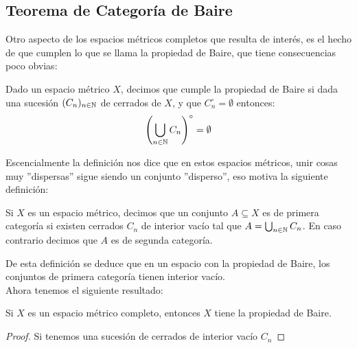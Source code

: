 \documentclass[12pt,a4paper]{book}
\begin{document}
\subsection{Teorema de Categoría de Baire}
Otro aspecto de los espacios métricos completos que resulta de interés, es el hecho de que cumplen lo que se llama la propiedad de Baire, que tiene consecuencias poco obvias:
\begin{defi}
Dado un espacio métrico $X$, decimos que cumple la propiedad de Baire si dada una sucesión $(C_n)_{{n} \in \mathbb{N}}$ de cerrados de $X$, y que $C_n^\circ = \emptyset$ entonces:
$$ \left(\bigcup_{{n} \in \mathbb{N}} C_n \right)^\circ = \emptyset$$
\end{defi}
Escencialmente la definición nos dice que en estos espacios métricos, unir cosas muy ''dispersas'' sigue siendo un conjunto ''disperso'', eso motiva la siguiente definición:
\begin{defi}
Si $X$ es un espacio métrico, decimos que un conjunto $A  \subseteq X$ es de primera categoría si existen cerrados $C_n$ de interior vacío tal que $A = \bigcup_{{n} \in \mathbb{N}} C_n$. En caso contrario decimos que $A$ es de segunda categoría.
\end{defi}
De esta definición se deduce que en un espacio con la propiedad de Baire, los conjuntos de primera categoría tienen interior vacío.\\[0.5cm]
Ahora tenemos el siguiente resultado:
\begin{teo}
Si $X$ es un espacio métrico completo, entonces $X$ tiene la propiedad de Baire.
\begin{proof}
Si tenemos una sucesión de cerrados de interior vacío $C_n$
\end{proof}
\end{teo}


\ifx\isEmbedded\undefined
\end{document}
